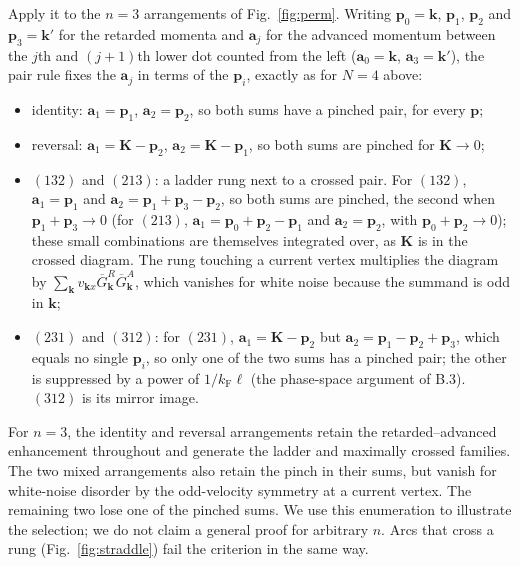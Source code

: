 Apply it to the $n=3$ arrangements of Fig.~\ref{fig:perm}.
Writing $\mathbf p_0=\mathbf k$, $\mathbf p_1$, $\mathbf p_2$
and $\mathbf p_3=\mathbf k'$ for the retarded momenta and
$\mathbf a_j$ for the advanced momentum between the $j$th and
$(j+1)$th lower dot counted from the left
($\mathbf a_0=\mathbf k$, $\mathbf a_3=\mathbf k'$), the pair
rule fixes the $\mathbf a_j$ in terms of the $\mathbf p_i$,
exactly as for $N=4$ above:
\begin{itemize}
 \item identity:
 $\mathbf a_1=\mathbf p_1$, $\mathbf a_2=\mathbf p_2$,
 so both sums have a pinched pair, for every $\mathbf p$;

 \item reversal:
 $\mathbf a_1=\mathbf K-\mathbf p_2$,
 $\mathbf a_2=\mathbf K-\mathbf p_1$,
 so both sums are pinched for $\mathbf K\to0$;

 \item $(132)$ and $(213)$: a ladder rung next to a crossed pair.
 For $(132)$,
 $\mathbf a_1=\mathbf p_1$ and
 $\mathbf a_2=\mathbf p_1+\mathbf p_3-\mathbf p_2$,
 so both sums are pinched, the second when
 $\mathbf p_1+\mathbf p_3\to0$ (for $(213)$,
 $\mathbf a_1=\mathbf p_0+\mathbf p_2-\mathbf p_1$ and
 $\mathbf a_2=\mathbf p_2$, with
 $\mathbf p_0+\mathbf p_2\to0$); these small combinations are
 themselves integrated over, as $\mathbf K$ is in the crossed
 diagram. The rung touching a current vertex multiplies the
 diagram by
 $\sum_{\mathbf k}v_{\mathbf kx}
 \overline G^R_{\mathbf k}\overline G^A_{\mathbf k}$,
 which vanishes for white noise because the summand is odd
 in $\mathbf k$;

 \item $(231)$ and $(312)$: for $(231)$,
 $\mathbf a_1=\mathbf K-\mathbf p_2$ but
 $\mathbf a_2=\mathbf p_1-\mathbf p_2+\mathbf p_3$,
 which equals no single $\mathbf p_i$, so only one of the two
 sums has a pinched pair; the other is suppressed by a power
 of $1/k_{\mathrm F}\ell$ (the phase-space argument of B.3).
 $(312)$ is its mirror image.
\end{itemize}
For $n=3$, the identity and reversal arrangements retain the
retarded--advanced enhancement throughout and generate the
ladder and maximally crossed families. The two mixed arrangements
also retain the pinch in their sums, but vanish for white-noise
disorder by the odd-velocity symmetry at a current vertex. The
remaining two lose one of the pinched sums. We use this
enumeration to illustrate the selection; we do not claim a
general proof for arbitrary $n$. Arcs that cross a rung
(Fig.~\ref{fig:straddle}) fail the criterion in the same way.


